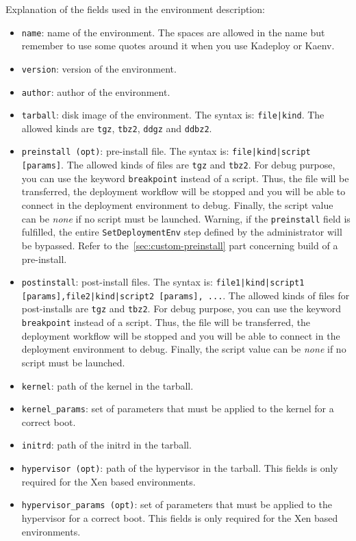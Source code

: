 \documentclass[a4wide,10pt,oneside]{book}
\begin{document}
Explanation of the fields used in the environment description:
\begin{itemize}
\item \texttt{name}: name of the environment. The spaces are allowed in the name but remember to use some quotes around it when you use Kadeploy or Kaenv.
\item \texttt{version}: version of the environment.
\item \texttt{author}: author of the environment.
\item \texttt{tarball}: disk image of the environment. The syntax is: \texttt{file|kind}. The allowed kinds are \texttt{tgz}, \texttt{tbz2}, \texttt{ddgz} and \texttt{ddbz2}.
\item \texttt{preinstall (opt)}: pre-install file. The syntax is: \texttt{file|kind|script [params]}. The allowed kinds of files are \texttt{tgz} and \texttt{tbz2}. For debug purpose, you can use the keyword \texttt{breakpoint} instead of a script. Thus, the file will be transferred, the deployment workflow will be stopped and you will be able to connect in the deployment environment to debug. Finally, the script value can be \textit{none} if no script must be launched. Warning, if the \texttt{preinstall} field is fulfilled, the entire \texttt{SetDeploymentEnv} step defined by the administrator will be bypassed. Refer to the~\ref{sec:custom-preinstall} part concerning build of a pre-install.
\item \texttt{postinstall}: post-install files. The syntax is: \texttt{file1|kind|script1 [params],file2|kind|script2 [params], ...}. The allowed kinds of files for post-installs are \texttt{tgz} and \texttt{tbz2}. For debug purpose, you can use the keyword \texttt{breakpoint} instead of a script. Thus, the file will be transferred, the deployment workflow will be stopped and you will be able to connect in the deployment environment to debug. Finally, the script value can be \textit{none} if no script must be launched.
\item \texttt{kernel}: path of the kernel in the tarball.
\item \texttt{kernel\_params}: set of parameters that must be applied to the kernel for a correct boot.
\item \texttt{initrd}: path of the initrd in the tarball.
\item \texttt{hypervisor (opt)}: path of the hypervisor in the tarball. This fields is only required for the Xen based environments.
\item \texttt{hypervisor\_params (opt)}: set of parameters that must be applied to the hypervisor for a correct boot. This fields is only required for the Xen based environments.

\end{itemize}
\end{document}
